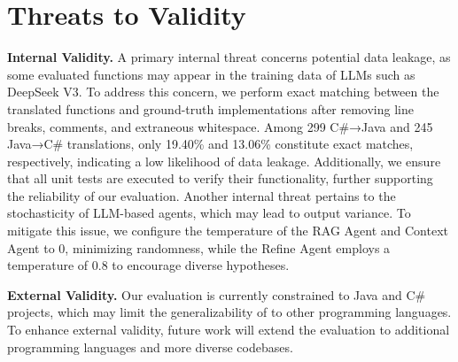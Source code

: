 \section{Threats to Validity}

\noindent\textbf{Internal Validity.} A primary internal threat concerns potential data leakage, as some evaluated functions may appear in the training data of LLMs such as DeepSeek V3. To address this concern, we perform exact matching between the translated functions and ground-truth implementations after removing line breaks, comments, and extraneous whitespace. Among 299 C\#→Java and 245 Java→C\# translations, only 19.40\% and 13.06\% constitute exact matches, respectively, indicating a low likelihood of data leakage. Additionally, we ensure that all unit tests are executed to verify their functionality, further supporting the reliability of our evaluation. Another internal threat pertains to the stochasticity of LLM-based agents, which may lead to output variance. To mitigate this issue, we configure the temperature of the RAG Agent and Context Agent to 0, minimizing randomness, while the Refine Agent employs a temperature of 0.8 to encourage diverse hypotheses.

\noindent\textbf{External Validity.} Our evaluation is currently constrained to Java and C\# projects, which may limit the generalizability of \toolname to other programming languages. To enhance external validity, future work will extend the evaluation to additional programming languages and more diverse codebases.

